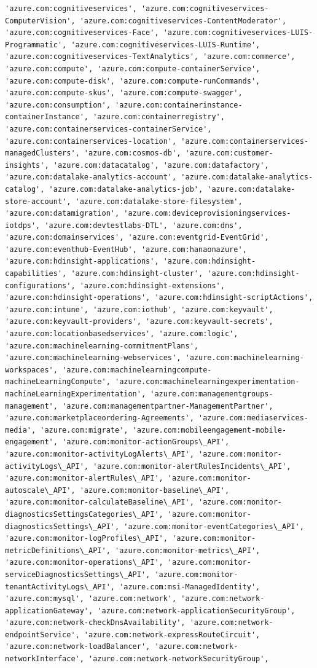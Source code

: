 \documentclass[11pt]{article}
\begin{document}
\begin{Verbatim}[commandchars=\\\{\}]
'azure.com:cognitiveservices', 'azure.com:cognitiveservices-ComputerVision', 'azure.com:cognitiveservices-ContentModerator', 'azure.com:cognitiveservices-Face', 'azure.com:cognitiveservices-LUIS-Programmatic', 'azure.com:cognitiveservices-LUIS-Runtime', 'azure.com:cognitiveservices-TextAnalytics', 'azure.com:commerce', 'azure.com:compute', 'azure.com:compute-containerService', 'azure.com:compute-disk', 'azure.com:compute-runCommands', 'azure.com:compute-skus', 'azure.com:compute-swagger', 'azure.com:consumption', 'azure.com:containerinstance-containerInstance', 'azure.com:containerregistry', 'azure.com:containerservices-containerService', 'azure.com:containerservices-location', 'azure.com:containerservices-managedClusters', 'azure.com:cosmos-db', 'azure.com:customer-insights', 'azure.com:datacatalog', 'azure.com:datafactory', 'azure.com:datalake-analytics-account', 'azure.com:datalake-analytics-catalog', 'azure.com:datalake-analytics-job', 'azure.com:datalake-store-account', 'azure.com:datalake-store-filesystem', 'azure.com:datamigration', 'azure.com:deviceprovisioningservices-iotdps', 'azure.com:devtestlabs-DTL', 'azure.com:dns', 'azure.com:domainservices', 'azure.com:eventgrid-EventGrid', 'azure.com:eventhub-EventHub', 'azure.com:hanaonazure', 'azure.com:hdinsight-applications', 'azure.com:hdinsight-capabilities', 'azure.com:hdinsight-cluster', 'azure.com:hdinsight-configurations', 'azure.com:hdinsight-extensions', 'azure.com:hdinsight-operations', 'azure.com:hdinsight-scriptActions', 'azure.com:intune', 'azure.com:iothub', 'azure.com:keyvault', 'azure.com:keyvault-providers', 'azure.com:keyvault-secrets', 'azure.com:locationbasedservices', 'azure.com:logic', 'azure.com:machinelearning-commitmentPlans', 'azure.com:machinelearning-webservices', 'azure.com:machinelearning-workspaces', 'azure.com:machinelearningcompute-machineLearningCompute', 'azure.com:machinelearningexperimentation-machineLearningExperimentation', 'azure.com:managementgroups-management', 'azure.com:managementpartner-ManagementPartner', 'azure.com:marketplaceordering-Agreements', 'azure.com:mediaservices-media', 'azure.com:migrate', 'azure.com:mobileengagement-mobile-engagement', 'azure.com:monitor-actionGroups\_API', 'azure.com:monitor-activityLogAlerts\_API', 'azure.com:monitor-activityLogs\_API', 'azure.com:monitor-alertRulesIncidents\_API', 'azure.com:monitor-alertRules\_API', 'azure.com:monitor-autoscale\_API', 'azure.com:monitor-baseline\_API', 'azure.com:monitor-calculateBaseline\_API', 'azure.com:monitor-diagnosticsSettingsCategories\_API', 'azure.com:monitor-diagnosticsSettings\_API', 'azure.com:monitor-eventCategories\_API', 'azure.com:monitor-logProfiles\_API', 'azure.com:monitor-metricDefinitions\_API', 'azure.com:monitor-metrics\_API', 'azure.com:monitor-operations\_API', 'azure.com:monitor-serviceDiagnosticsSettings\_API', 'azure.com:monitor-tenantActivityLogs\_API', 'azure.com:msi-ManagedIdentity', 'azure.com:mysql', 'azure.com:network', 'azure.com:network-applicationGateway', 'azure.com:network-applicationSecurityGroup', 'azure.com:network-checkDnsAvailability', 'azure.com:network-endpointService', 'azure.com:network-expressRouteCircuit', 'azure.com:network-loadBalancer', 'azure.com:network-networkInterface', 'azure.com:network-networkSecurityGroup', 
\end{Verbatim}
\end{document}
